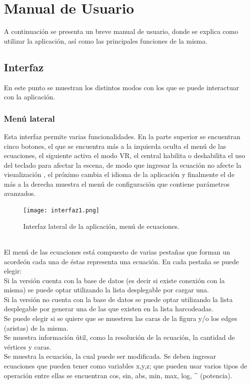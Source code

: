 \documentclass[12pt]{article}
\begin{document}
\section{Manual de Usuario}
A continuación se presenta un breve manual de usuario, donde se explica como utilizar la aplicación, así como las principales funciones de la misma.
\subsection{Interfaz}
En este punto se muestran los distintos modos con los que se puede interactuar con la aplicación.
\subsubsection{Menú lateral}
Esta interfaz permite varias funcionalidades. En la parte superior se encuentran cinco botones, el que se encuentra más a la izquierda oculta el menú de las ecuaciones, el siguiente activa el modo VR, el central habilita o deshabilita el uso del teclado para afectar la escena, de modo que ingresar la ecuación no afecte la visualización , el próximo cambia el idioma de la aplicación y finalmente el de más a la derecha muestra el menú de configuración que contiene parámetros avanzados.
\begin{figure}
\texttt{[image: interfaz1.png]} 
\caption{Interfaz lateral de la aplicación, menú de ecuaciones.}
\label{fig:subim1}
\end{figure}
\\El menú de las ecuaciones está compuesto de varias pestañas que forman un acordeón cada una de éstas representa una ecuación. En cada pestaña se puede elegir:
\\Si la versión cuenta con la base de datos (es decir si existe conexión con la misma) se puede optar utilizando la lista desplegable por cargar una.
\\Si la versión no cuenta con la base de datos se puede optar utilizando la lista desplegable por generar una de las que existen en la lista harcodeadas.
\\Se puede elegir si se quiere que se muestren las caras de la figura y/o los edges (aristas) de la misma.
\\Se muestra información útil, como la resolución de la ecuación, la cantidad de vértices y caras.
\\Se muestra la ecuación, la cual puede ser modificada. Se deben ingresar ecuaciones que pueden tener como variables x,y,z; que pueden usar varios tipos de operación entre ellas se encuentran cos, sin, abs, min, max, log, \string^ (potencia).
\end{document}

